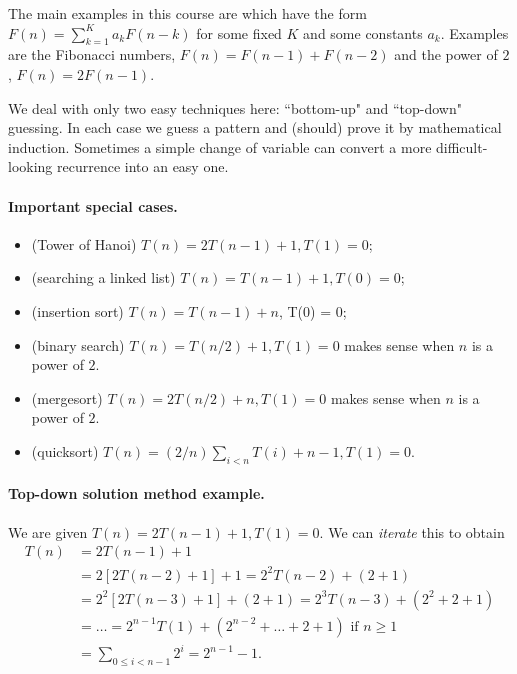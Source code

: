 The main examples  in this course are  which have the form 
$F(n) = \sum_{k=1}^K a_k F(n - k)$ for some fixed $K$ and some constants $a_k$. 
Examples are the Fibonacci numbers, $F(n) = F(n-1) + F(n-2)$ and the power of $2$, $F(n) = 2F(n-1)$.

We deal with only two easy techniques here: ``bottom-up" and ``top-down" guessing. 
In each case we guess a pattern and (should) prove it by mathematical induction. 
Sometimes a simple change of variable can convert a more difficult-looking recurrence into an easy one. 

\paragraph{Important special cases.}
\begin{itemize}
\item (Tower of Hanoi) $T(n) = 2 T(n - 1) + 1, T(1) = 0$;
\item (searching a linked list) $T(n) = T(n - 1) + 1, T(0) = 0$;
\item (insertion sort) $T(n) = T(n-1) + n$, T(0) = 0;
\item (binary search) $T(n) = T(n/2) + 1, T(1) = 0$ makes sense when $n$ is 
a power of $2$. 
\item (mergesort) $T(n) = 2T(n/2) + n, T(1) = 0$ makes sense when $n$ is 
a power of $2$.
\item (quicksort) $T(n) = (2/n)\sum_{i<n} T(i) + n-1, T(1) = 0$.
\end{itemize}

\paragraph{Top-down solution method example.}
We are given $T(n) = 2 T(n - 1) + 1, T(1) = 0$.
We can \emph{iterate} this to obtain 
\begin{align*}
T(n) & = 2 T(n - 1) + 1  \\
& = 2 [2 T(n - 2) + 1] + 1 = 2^2 T(n-2) + (2 + 1) \\
& = 2^2 [2T(n - 3) + 1] + (2 + 1) = 2^3 T(n - 3) + (2^2 + 2+ 1)  \\ 
& = \dots = 2^{n-1} T(1) + (2^{n-2} + \dots + 2 + 1)  \text{ if $n \geq 1$} \\
& = \sum_{0\leq i < n-1} 2^i = 2^{n-1} - 1.
\end{align*}


